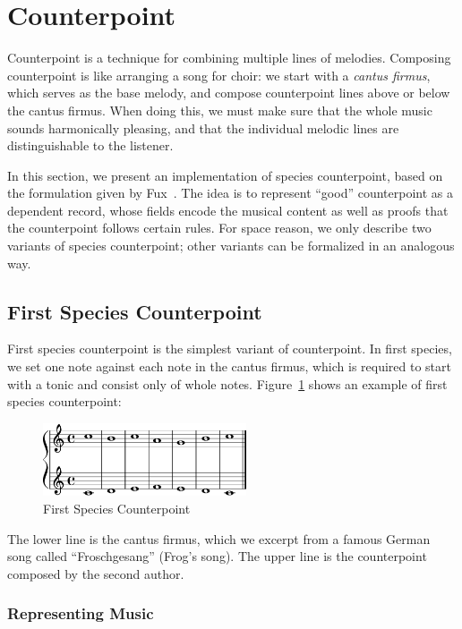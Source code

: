 \section{Counterpoint}
\label{sec:cp}

Counterpoint is a technique for combining multiple lines of melodies.
Composing counterpoint is like arranging a song for choir:
we start with a \emph{cantus firmus}, which serves as the base melody,
and compose counterpoint lines above or below the cantus firmus.
When doing this, we must make sure that the whole music sounds
harmonically pleasing, and that the individual melodic lines are
distinguishable to the listener.

In this section, we present an implementation of species counterpoint,
based on the formulation given by Fux~\citep{fux-cp}.
The idea is to represent ``good'' counterpoint  as a dependent record,
whose fields encode the musical content as well as proofs that the
counterpoint follows certain rules.
For space reason, we only describe two variants of species counterpoint;
other variants can be formalized in an analogous way.

\subsection{First Species Counterpoint}
\label{sec:cp:fs}

First species counterpoint is the simplest variant of counterpoint.
In first species, we set one note against each note in the cantus firmus,
which is required to start with a tonic and consist only of whole notes.
Figure~\ref{fig:fs} shows an example of first species counterpoint:

\begin{figure}[h]
  \includegraphics[width=6cm]{fig/fs.png}
  \caption{First Species Counterpoint}
  \label{fig:fs}
\end{figure}

\noindent The lower line is the cantus firmus, which we excerpt from
a famous German song called ``Froschgesang'' (Frog's song).
The upper line is the counterpoint composed by the second author.

\subsubsection{Representing Music}

